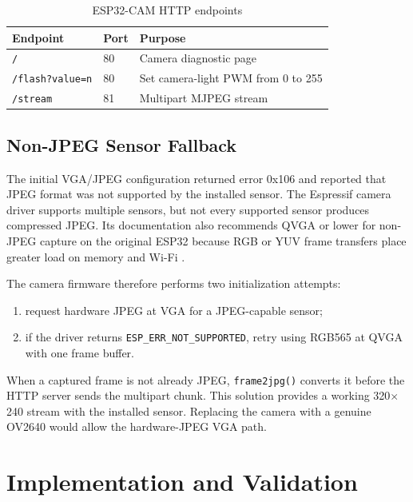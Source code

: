 \documentclass[12pt,a4paper,oneside]{report}
\newcommand{\code}[1]{\texttt{#1}}
\begin{document}
\begin{table}[H]
  \centering
  \caption{ESP32-CAM HTTP endpoints}
  \label{tab:camera-endpoints}
  \begin{tabularx}{\textwidth}{p{3.3cm}p{2cm}Y}
    \toprule
    \textbf{Endpoint} & \textbf{Port} & \textbf{Purpose} \\
    \midrule
    \code{/} & 80 & Camera diagnostic page \\
    \code{/flash?value=n} & 80 & Set camera-light PWM from 0 to 255 \\
    \code{/stream} & 81 & Multipart MJPEG stream \\
    \bottomrule
  \end{tabularx}
\end{table}

\section{Non-JPEG Sensor Fallback}
\label{sec:camera-fallback}
The initial VGA/JPEG configuration returned error 0x106 and reported that JPEG
format was not supported by the installed sensor. The Espressif camera driver
supports multiple sensors, but not every supported sensor produces compressed
JPEG. Its documentation also recommends QVGA or lower for non-JPEG capture on
the original ESP32 because RGB or YUV frame transfers place greater load on
memory and Wi-Fi \cite{esp32camera}.

The camera firmware therefore performs two initialization attempts:

\begin{enumerate}
  \item request hardware JPEG at VGA for a JPEG-capable sensor;
  \item if the driver returns \code{ESP\_ERR\_NOT\_SUPPORTED}, retry using
        RGB565 at QVGA with one frame buffer.
\end{enumerate}

When a captured frame is not already JPEG, \code{frame2jpg()} converts it before
the HTTP server sends the multipart chunk. This solution provides a working
320$\times$240 stream with the installed sensor. Replacing the camera with a
genuine OV2640 would allow the hardware-JPEG VGA path.

\chapter{Implementation and Validation}
\label{ch:validation}
\end{document}
